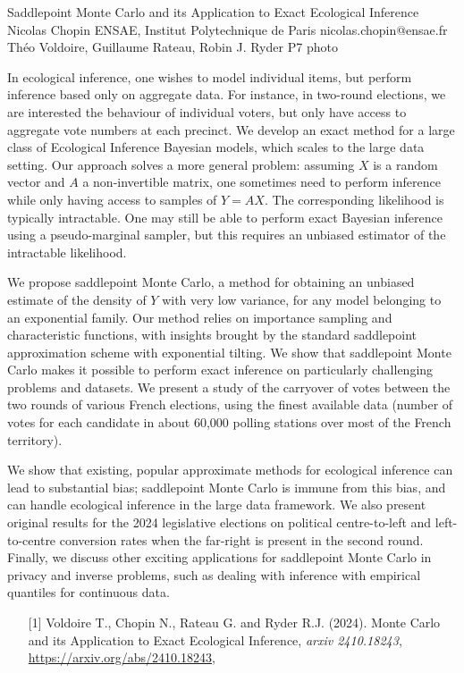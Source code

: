 \clearpage

\begin{talk}
  {Saddlepoint Monte Carlo and its Application to Exact Ecological Inference}%
  {Nicolas Chopin}%
  {ENSAE, Institut Polytechnique de Paris}%
  {nicolas.chopin@ensae.fr}%
  {Théo Voldoire, Guillaume Rateau, Robin J. Ryder}%
  {}%
  {}%
  {P7}%
  {photo}%
			

In ecological inference, one wishes to model individual items, but perform
inference based only on aggregate data.  For instance, in two-round elections,
we are interested the behaviour of individual voters, but only have access to
aggregate vote numbers at each precinct.  We develop an exact method for a
large class of Ecological Inference Bayesian models, which scales  to the large
data setting.  Our approach solves a more general problem:  assuming $X$ is a
random vector and $A$ a non-invertible matrix, one sometimes need to perform
inference while only having access to samples of $Y=AX$. The corresponding
likelihood is typically intractable. One may still be able to perform exact
Bayesian inference using a pseudo-marginal sampler, but this requires an
unbiased estimator of the intractable likelihood.

We propose saddlepoint Monte Carlo, a method for obtaining an unbiased estimate
of the density of $Y$ with very low variance, for any model belonging to an
exponential family. Our method relies on importance sampling and 
characteristic functions, with insights brought by the standard saddlepoint
approximation scheme with exponential tilting.  We show that saddlepoint Monte
Carlo makes it possible to perform exact inference on particularly challenging
problems and datasets.  We present a study of the carryover of votes between
the two rounds of various French elections, using the finest available data
(number of votes for each candidate in about 60,000 polling stations over most
of the French territory). 

We show that existing, popular approximate methods for ecological inference can
lead to substantial bias; saddlepoint Monte Carlo is immune from this bias, and 
can handle ecological inference in the large data framework. We also
present original results for the 2024 legislative elections on political
centre-to-left and left-to-centre conversion rates when the far-right is
present in the second round. Finally, we discuss other exciting applications
for saddlepoint Monte Carlo in privacy and inverse problems, such as dealing
with inference with empirical quantiles for continuous data.

\medskip

\begin{enumerate}
	\item[{[1]}] 
      Voldoire T., Chopin N., Rateau G. and Ryder R.J. (2024).
      Monte Carlo and its Application to Exact Ecological Inference, 
      \textit{arxiv 2410.18243},
      \url{https://arxiv.org/abs/2410.18243}, 
\end{enumerate}

\end{talk}

\clearpage

